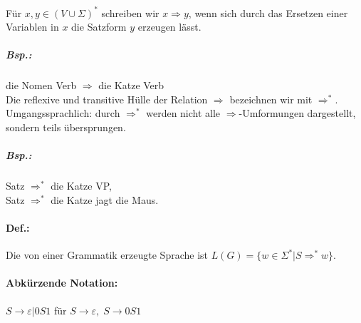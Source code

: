 Für $x,y\in (V \cup \Sigma)^*$ schreiben wir $x \Rightarrow y$, wenn sich durch das Ersetzen einer Variablen in $x$ die Satzform $y$ erzeugen lässt.
\subparagraph{Bsp.:} die Nomen Verb $\Rightarrow$ die Katze Verb\medskip\\
Die reflexive und transitive Hülle der Relation $\Rightarrow$ bezeichnen wir mit $\Rightarrow^*$. Umgangssprachlich: durch $\Rightarrow^*$ werden nicht alle $\Rightarrow$-Umformungen dargestellt, sondern teils übersprungen.
\subparagraph{Bsp.:} \parskp
Satz $\Rightarrow^*$ die Katze VP, \\
Satz $\Rightarrow^*$ die Katze jagt die Maus.
\paragraph{Def.:} Die von einer Grammatik erzeugte Sprache ist $L(G)=\{w\in \Sigma^* | S \Rightarrow^* w\}$.
\paragraph{Abkürzende Notation:} \parskp
$S\to \varepsilon | 0S1$ für $S\to \varepsilon, \; S \to 0S1$

